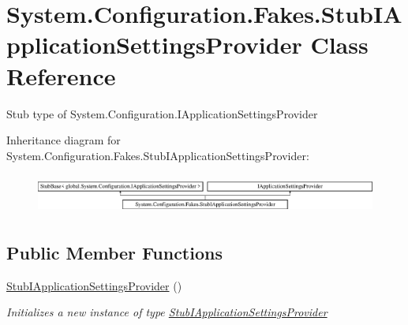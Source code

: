 \hypertarget{class_system_1_1_configuration_1_1_fakes_1_1_stub_i_application_settings_provider}{\section{System.\-Configuration.\-Fakes.\-Stub\-I\-Application\-Settings\-Provider Class Reference}
\label{class_system_1_1_configuration_1_1_fakes_1_1_stub_i_application_settings_provider}
}


Stub type of System.\-Configuration.\-I\-Application\-Settings\-Provider 


Inheritance diagram for System.\-Configuration.\-Fakes.\-Stub\-I\-Application\-Settings\-Provider\-:\begin{figure}[H]
\begin{center}
\leavevmode
\includegraphics[height=1.339713cm]{class_system_1_1_configuration_1_1_fakes_1_1_stub_i_application_settings_provider}
\end{center}
\end{figure}
\subsection*{Public Member Functions}
\begin{DoxyCompactItemize}
\item 
\hyperlink{class_system_1_1_configuration_1_1_fakes_1_1_stub_i_application_settings_provider_a4b749cd81626f9476f898f6a1a97ca06}{Stub\-I\-Application\-Settings\-Provider} ()
\begin{DoxyCompactList}\small\item\em Initializes a new instance of type \hyperlink{class_system_1_1_configuration_1_1_fakes_1_1_stub_i_application_settings_provider}{Stub\-I\-Application\-Settings\-Provider}\end{DoxyCompactList}\end{DoxyCompactItemize}
